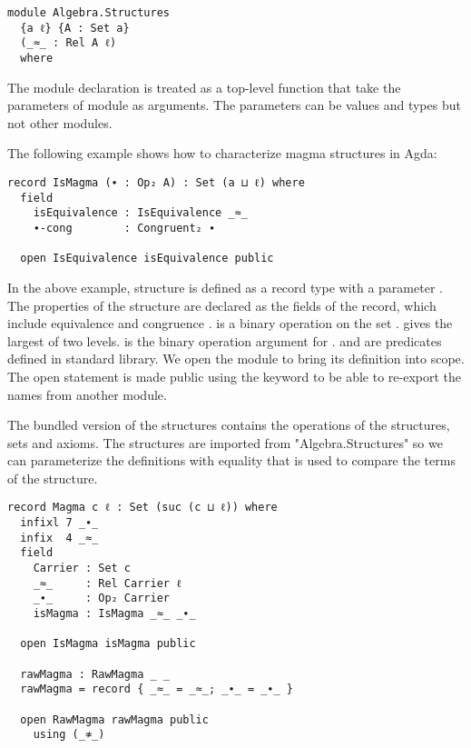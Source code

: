 \begin{verbatim}
module Algebra.Structures
  {a ℓ} {A : Set a} 
  (_≈_ : Rel A ℓ)    
  where
\end{verbatim}

The module declaration is treated as a top-level function that take the
parameters of module as arguments. The parameters can be values and types but
not other modules.

The following example shows how to characterize magma
structures in Agda:
\begin{verbatim}
record IsMagma (∙ : Op₂ A) : Set (a ⊔ ℓ) where
  field
    isEquivalence : IsEquivalence _≈_
    ∙-cong        : Congruent₂ ∙

  open IsEquivalence isEquivalence public
\end{verbatim}

In the above example, structure  is defined as a record type
with a parameter . The properties of the structure
 are declared as the fields of the record, which include
equivalence  and congruence .  is
a binary operation on the set .  gives the largest of
two levels.  is the binary operation argument for
.  and  are
predicates defined in standard library. We open the module
 to bring its definition into scope. The open statement is
made public using the keyword  to be able to re-export the names
from another module.

The bundled version of the structures contains the operations of the structures,
sets and axioms. The structures are imported from "Algebra.Structures" so we can
parameterize the definitions with equality that is used to compare the terms of
the structure.

\begin{verbatim}
record Magma c ℓ : Set (suc (c ⊔ ℓ)) where
  infixl 7 _∙_
  infix  4 _≈_
  field
    Carrier : Set c
    _≈_     : Rel Carrier ℓ
    _∙_     : Op₂ Carrier
    isMagma : IsMagma _≈_ _∙_

  open IsMagma isMagma public

  rawMagma : RawMagma _ _
  rawMagma = record { _≈_ = _≈_; _∙_ = _∙_ }

  open RawMagma rawMagma public
    using (_≉_)
\end{verbatim}

